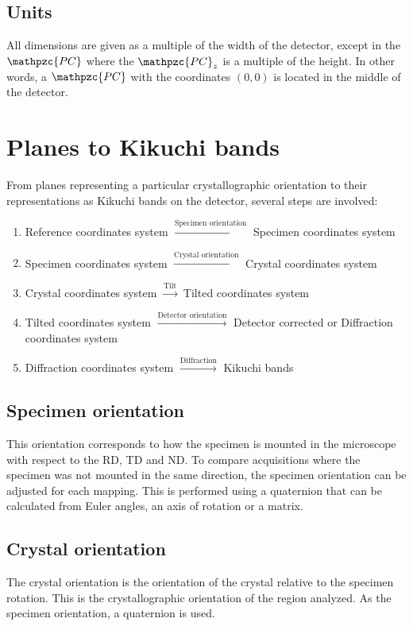 \documentclass[letterpaper]{article}
\newcommand{\var}[1]{\mathpzc{#1}}
\begin{document}
	\subsection{Units}
	All dimensions are given as a multiple of the width of the detector, except in the $\var{PC}$ where the $\var{PC}_z$ is a multiple of the height.
	In other words, a $\var{PC}$ with the coordinates $(0, 0)$ is located in the middle of the detector.	
	
	\section{Planes to Kikuchi bands}
	From planes representing a particular crystallographic orientation to their representations as Kikuchi bands on the detector, several steps are involved:
	\begin{enumerate}
		\item Reference coordinates system $\xrightarrow{\text{Specimen orientation}}$ Specimen coordinates system
		\item Specimen coordinates system $\xrightarrow{\text{Crystal orientation}}$ Crystal coordinates system
		\item Crystal coordinates system $\xrightarrow{\text{Tilt}}$ Tilted coordinates system
		\item Tilted coordinates system $\xrightarrow{\text{Detector orientation}}$ Detector corrected or Diffraction coordinates system
		\item Diffraction coordinates system $\xrightarrow{\text{Diffraction}}$ Kikuchi bands
	\end{enumerate}
	
	\subsection{Specimen orientation}
	This orientation corresponds to how the specimen is mounted in the microscope with respect to the RD, TD and ND. 
	To compare acquisitions where the specimen was not mounted in the same direction, the specimen orientation can be adjusted for each mapping.
	This is performed using a quaternion that can be calculated from Euler angles, an axis of rotation or a matrix.
	
	\subsection{Crystal orientation}
	The crystal orientation is the orientation of the crystal relative to the specimen rotation. 
	This is the crystallographic orientation of the region analyzed.
	As the specimen orientation, a quaternion is used.
	
\end{document}
